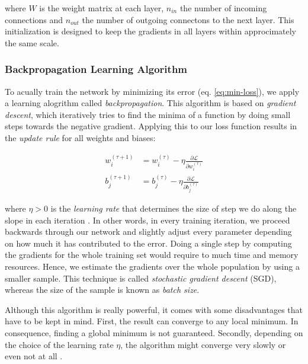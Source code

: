 where $ W $ is the weight matrix at each layer, $ n_{in} $ the number of incoming connections and $ n_{out} $ the number of outgoing connectons to the next layer. This initialization is designed to keep the gradients in all layers within approcimately the same scale.

\subsubsection{Backpropagation Learning Algorithm}

To acually train the network by minimizing its error (eq. \ref{eq:min-loss}), we apply a learning alogrithm called \textit{backpropagation}. This algorithm is based on \textit{gradient descent}, which iteratively tries to find the minima of a function by doing small steps towards the negative gradient. Applying this to our loss function results in the \textit{update rule} for all weights and biases:

\begin{equation} \label{eq:gradient_descent}
\begin{aligned}
w_{i}^{(\tau + 1)} &= w_{i}^{(\tau)} - \eta \frac{\partial \mathcal{L}}{\partial w_{i}^{(\tau)}} \\
b_{j}^{(\tau + 1)} &= b_{j}^{(\tau)} - \eta \frac{\partial \mathcal{L}}{\partial b_{j}^{(\tau)}}
\end{aligned}
\end{equation}

where $ \eta > 0 $ is the \textit{learning rate} that determines the size of step we do along the slope in each iteration \parencite{pattern_and_ml}. In other words, in every training iteration, we proceed backwards through our network and slightly adjust every parameter depending on how much it has contributed to the error. Doing a single step by computing the gradients for the whole training set would require to much time and memory resources. Hence, we estimate the gradients over the whole population by using a smaller sample. This technique is called \textit{stochastic gradient descent} (SGD), whereas the size of the sample is known as \textit{batch size}.

Although this algorithm is really powerful, it comes with some disadvantages that have to be kept in mind. First, the result can converge to any local minimum. In consequence, finding a global minimum is not guaranteed. Secondly, depending on the choice of the learning rate $ \eta $, the algorithm might converge very slowly or even not at all \parencite{ann}.

